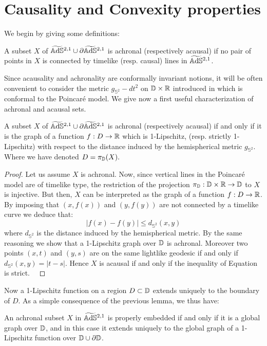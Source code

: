 \section{Causality and Convexity properties}
We begin by giving some definitions:
\begin{definition}
    A subset $X$ of $\widetilde{\mathbb{A}\mathrm{d}\mathbb{S}}{}^{2,1}\cup \partial\widetilde{\mathbb{A}\mathrm{d}\mathbb{S}}{}^{2,1}$ is achronal (respectively acausal) if no pair of points in $X$ is connected by timelike (resp. causal) lines in $\widetilde{\mathbb{A}\mathrm{d}\mathbb{S}}{}^{2,1}$.
\end{definition}
Since acausality and achronality are conformally invariant notions, it will be often convenient to consider the metric $g_{\mathbb{S}^2}-dt^2$ on $\mathbb{D}\times\mathbb{R}$ introduced in  which is conformal to the Poincaré model. We give now a first useful characterization of achronal and acausal sets.
\begin{lemma}
    A subset $X$ of $\widetilde{\mathbb{A}\mathrm{d}\mathbb{S}}{}^{2,1}\cup \partial\widetilde{\mathbb{A}\mathrm{d}\mathbb{S}}{}^{2,1}$ is achronal (respectively acausal) if and only if it is the graph of a function $f:D\to\mathbb{R}$ which is 1-Lipschitz, (resp. strictly 1-Lipschitz) with respect to the distance induced by the hemispherical metric $g_{\mathbb{S}^2}$.\\
    Where we have denoted $D=\pi_{\mathbb{D}}(X).$ 
\end{lemma}
\begin{proof}
     Let us assume $X$ is achronal. Now, since vertical lines in the Poincaré model are of timelike type, the restriction of the projection $\pi_{\mathbb{D}}:\mathbb{D}\times\mathbb{R}\to\mathbb{D}$ to $X$ is injective. But then, $X$ can be interpreted as the graph of a function $f:D\to\mathbb{R}$. By imposing that $(x,f(x))$ and $(y,f(y))$ are not connected by a timelike curve we deduce that: 
     \begin{equation}\label{soloqua}
        |f(x)-f(y)|\leq d_{\mathbb{S}^2}(x,y)
     \end{equation}
     where $d_{\mathbb{S}^2}$ is the distance induced by the hemispherical metric. By the same reasoning we show that a 1-Lipschitz graph over $\mathbb{D}$ is achronal. Moreover two points $(x,t)$ and $(y,s)$ are on the same lightlike geodesic if and only if $d_{\mathbb{S}^2}(x,y)=|t-s|$. Hence $X$ is acausal if and only if the inequality of Equation  is strict. \
\end{proof}

Now a 1-Lipschitz function on a region $D\subset \mathbb{D}$ extends uniquely to the boundary of $D$. As a simple consequence of the previous lemma, we thus have: 

\begin{lemma}\label{achronalgraph}
    An achronal subset $X$ in $\widetilde{\mathbb{A}\mathrm{d}\mathbb{S}}{}^{2,1}$ is properly embedded if and only if it is a global graph over $\mathbb{D}$, and in this case it extends uniquely to the global graph of a 1-Lipschitz function over $\mathbb{D}\cup\partial\mathbb{D}$.
\end{lemma}

